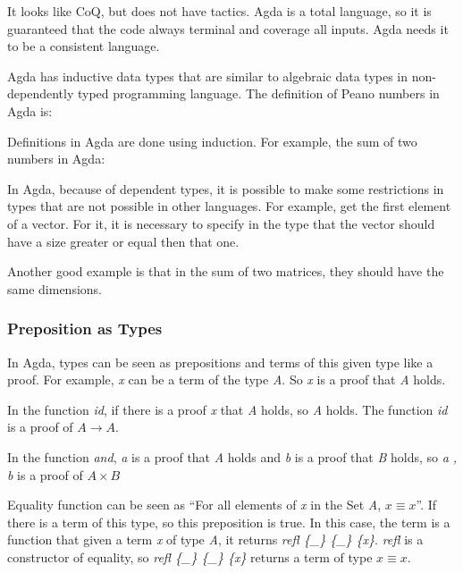 It looks like CoQ, but does not have tactics.
Agda is a total language, so it is guaranteed that the code always terminal and coverage all inputs.
Agda needs it to be a consistent language.

Agda has inductive data types that are similar to algebraic data types in non-dependently
typed programming language.
The definition of Peano numbers in Agda is:


Definitions in Agda are done using induction.
For example, the sum of two numbers in Agda:


In Agda, because of dependent types, it is possible to make some restrictions in types that are not
possible in other languages.
For example, get the first element of a vector.
For it, it is necessary to specify in the type that the vector should have a size greater or equal
then that one.


Another good example is that in the sum of two matrices, they should have the same dimensions.


\subsubsection{Preposition as Types}

In Agda, types can be seen as prepositions and terms of this given type like a proof.
For example, \emph{x} can be a term of the type \emph{A}.
So \emph{x} is a proof that \emph{A} holds.


In the function \emph{id},
if there is a proof \emph{x} that \emph{A} holds,
so \emph{A} holds.
The function \emph{id} is a proof of $A \rightarrow A$.


In the function \emph{and}, \emph{a} is a proof that \emph{A} holds and
\emph{b} is a proof that \emph{B} holds,
so \emph{a , b} is a proof of $A \times B$


Equality function can be seen as
``For all elements of \emph{x} in the Set \emph{A}, $x \equiv x$''.
If there is a term of this type, so this preposition is true.
In this case, the term is a function that given a term \emph{x} of type \emph{A},
it returns \emph{refl \{\_\} \{\_\} \{x\}}.
\emph{refl} is a constructor of equality, so \emph{refl \{\_\} \{\_\} \{x\}}
returns a term of type $x \equiv x$.

